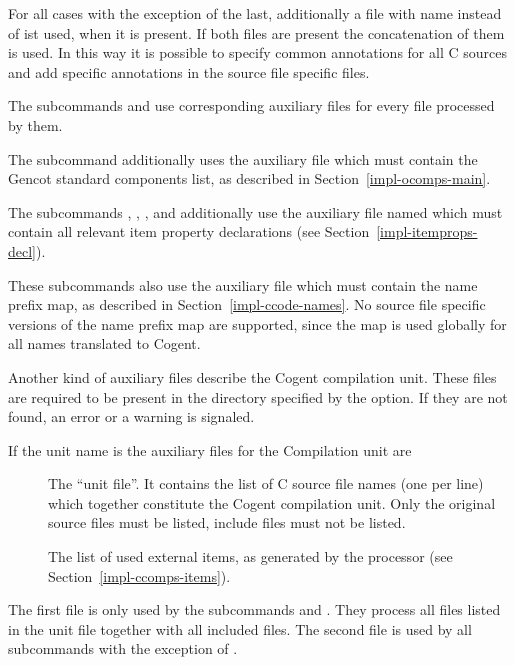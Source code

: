 For all cases with the exception of the last, additionally a file with name  instead of  ist used, when it
is present. If both files are present the concatenation of them is used. In this way it is possible to specify common annotations 
for all C sources and add specific annotations in the source file specific files.

The subcommands  and  use corresponding auxiliary files for every file  processed by them.

The subcommand  additionally uses the auxiliary file  which must contain the Gencot
standard components list, as described in Section~\ref{impl-ocomps-main}.

The subcommands , , , and  additionally use the auxiliary file named
 which must contain all relevant item property declarations (see Section~\ref{impl-itemprops-decl}).

These subcommands also use the auxiliary file  which must contain the name prefix map, 
as described in Section~\ref{impl-ccode-names}. No source file specific versions of the name prefix map are supported,
since the map is used globally for all names translated to Cogent.

Another kind of auxiliary files describe the Cogent compilation unit. These files are required to be present 
in the directory specified by the  option. If they are not found, an error or a warning is signaled.

If the unit name is  the auxiliary files for the Compilation unit are
\begin{description}
\item[] The ``unit file''. It contains the list of C source file names
(one per line) which together constitute the Cogent compilation unit. Only the original source files  must 
be listed, include files  must not be listed.
\item[] The list of used external items, as generated by the processor 
(see Section~\ref{impl-ccomps-items}).
\end{description}

The first file is only used by the subcommands  and . They process all files listed in the unit file
together with all included files. The second file is used by all  subcommands with the exception of .

